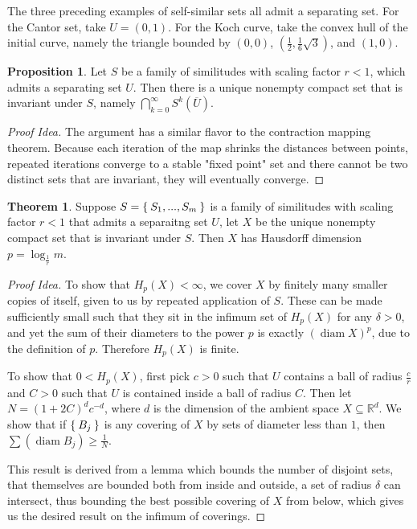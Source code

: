 \documentclass[11pt]{amsart}
\theoremstyle{definition}
\newtheorem{theorem}[definition]{Theorem}
\newtheorem{prop}[definition]{Proposition}
\newcommand{\R}{\ensuremath{\mathbb{R}}}
\DeclareMathOperator{\diam}{diam}
\begin{document}
The three preceding examples of self-similar sets all admit a separating set. For  the Cantor set, take \( U = (0,1) \). For the Koch curve, take the convex hull of the initial curve, namely the triangle bounded by \( \left( 0,0 \right)\), \(\left( \frac{1}{2}, \frac{1}{6}\sqrt{3} \right) \), and \( \left( 1,0 \right) \). 

\begin{prop}
	Let \( S \) be a family of similitudes with scaling factor \( r < 1 \), which admits a separating set \( U \). Then there is a unique nonempty compact set that is invariant under \(S\), namely \( \bigcap_{k = 0}^{\infty} S^k(\overline{U}) \).
\end{prop}

\begin{proof}[Proof Idea]
	The argument has a similar flavor to the contraction mapping theorem. Because each iteration of the map shrinks the distances between points, repeated iterations converge to a stable "fixed point" set and there cannot be two distinct sets that are invariant, they will eventually converge.
\end{proof}

\begin{theorem}
	Suppose \( S = \Set{S_1, ..., S_m} \) is a family of similitudes with scaling factor \( r < 1 \) that admits a separaitng set \( U \), let \( X \) be the unique nonempty compact set that is invariant under \( S \). Then \(X\) has Hausdorff dimension \( p = \log_{\frac{1}{r}} m \).
\end{theorem}

\begin{proof}[Proof Idea]
	To show that \( H_p(X) < \infty \), we cover \(X\) by finitely many smaller copies of itself, given to us by repeated application of \(S\). These can be made sufficiently small such that they sit in the infimum set of \(H_p(X)\) for any \(\delta > 0\), and yet the sum of their diameters to the power \(p\) is exactly \((\diam X)^p\), due to the definition of \(p\). Therefore \(H_p(X)\) is finite.
	
	To show that \( 0 < H_p(X) \), first pick \( c > 0 \) such that \(U\) contains a ball of radius \(\frac{c}{r}\) and \( C > 0 \) such that \(U\) is contained inside a ball of radius \(C\). Then let \( N = (1 + 2C)^d c^{-d} \), where \( d \) is the dimension of the ambient space \(X \subseteq \R^d\).
	We show that if \(\Set{B_j}\) is any covering of \(X\) by sets of diameter less than \(1\), then \( \sum (\diam B_j) \geq \frac{1}{N} \). 
	
	This result is derived from a lemma which bounds the number of disjoint sets, that themselves are bounded both from inside and outside, a set of radius \(\delta\) can intersect, thus bounding the best possible covering of \(X\) from below, which gives us the desired result on the infimum of coverings.
\end{proof}
\end{document}
